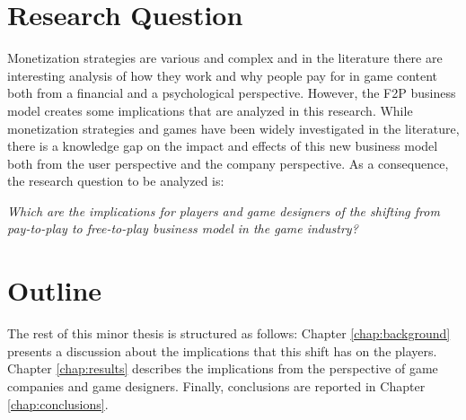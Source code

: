 \section{Research Question}
Monetization strategies are various and complex and in the literature there are interesting analysis of how they work and why people pay for in game content \cite{hamari_why_2015} both from a financial and a psychological perspective. However, the F2P business model creates some implications that are analyzed in this research. While monetization strategies \cite{holin_lin_cash_2011, park_exploring_2011, davidovici-nora_paid_2014} and games \cite{zagal_dark_2013} have been widely investigated in the literature, there is a knowledge gap on the impact and effects of this new business model both from the user perspective and the company perspective. As a consequence, the research question to be analyzed is:
\begin{center}
        \textit{ Which are the implications for players and game designers of the shifting from pay-to-play to free-to-play business model in the game industry?
}
\end{center}


\section{Outline}
The rest of this minor thesis is structured as follows:
Chapter \ref{chap:background} presents a discussion about the implications that this shift has on the players. Chapter \ref{chap:results} describes the implications from the perspective of game companies and game designers. Finally, conclusions are reported in Chapter \ref{chap:conclusions}.
